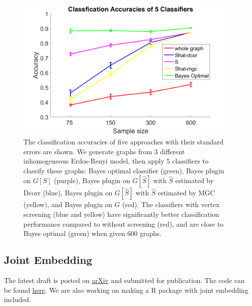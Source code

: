 \documentclass[simplex.tex]{subfiles}
\begin{document}
\begin{figure}[!h]
	\begin{cframed}
		\centering
		\includegraphics[scale=0.35, clip = true]{../../figs/Bayes_plugin_IER_3n.png}
		\caption{The classification accuracies of five approaches with their standard errors are shown. We generate graphs from $3$ different inhomogeneous Erdos-Renyi model, then apply $5$ classifiers to classify these graphs: Bayes optimal classifier (green), Bayes plugin on $G[S]$ (purple), Bayes plugin on $G[\hat{S}]$ with $\hat{S}$ estimated by Dcorr (blue), Bayes plugin on $G[\hat{S}]$ with $\hat{S}$ estimated by MGC (yellow), and Bayes plugin on $G$ (red). The classifiers with vertex screening (blue and yellow) have significantly better classification performance compared to without screening (red), and are close to Bayes optimal (green) when given $600$ graphs. }
		\label{fig:vs}
	\end{cframed}
\end{figure}
%
\clearpage

\subsection{Joint Embedding}
The latest draft is posted on \href{https://arxiv.org/abs/1703.03862}{arXiv} and submitted for publication. The code can be found \href{https://github.com/shangsiwang/Joint-Embedding}{here}. We are also working on making a R package with joint embedding included.



\clearpage
\end{document}
